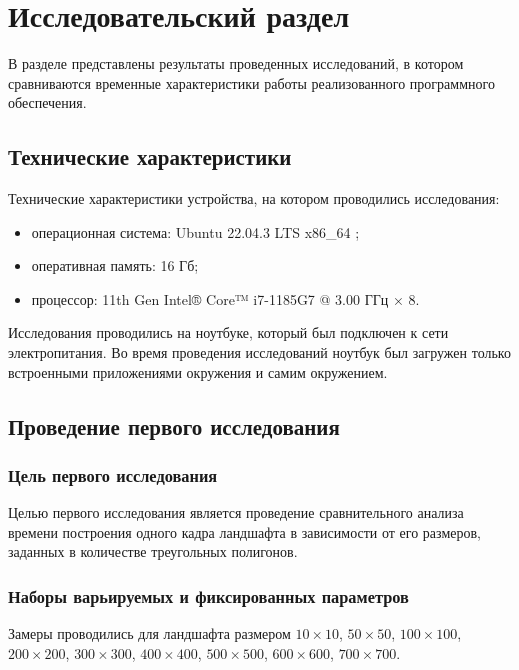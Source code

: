 \chapter{Исследовательский раздел}


В разделе представлены результаты проведенных исследований, в котором сравниваются временные характеристики работы реализованного
программного обеспечения.

\section{Технические характеристики}

Технические характеристики устройства, на котором проводились исследования: 

\begin{itemize}[label=--]
	\item операционная система: Ubuntu 22.04.3 LTS x86\_64 \cite{info_os};
	\item оперативная память: 16 Гб;
	\item процессор: 11th Gen Intel® Core™ i7-1185G7 @ 3.00 ГГц × 8.
\end{itemize}

Исследования проводились на ноутбуке, который был подключен к сети электропитания. Во время проведения исследований ноутбук был загружен только встроенными приложениями окружения и самим окружением.

\section{Проведение первого исследования}

\subsection{Цель первого исследования}

Целью первого исследования является проведение сравнительного анализа времени построения одного кадра ландшафта в зависимости от его размеров, заданных в количестве треугольных полигонов. 

\clearpage

\subsection{Наборы варьируемых и фиксированных параметров}

Замеры проводились для ландшафта размером $10\times10$, $50\times50$, $100\times100$, $200\times200$, $300\times300$, $400\times400$, $500\times500$, $600\times600$, $700\times700$.

